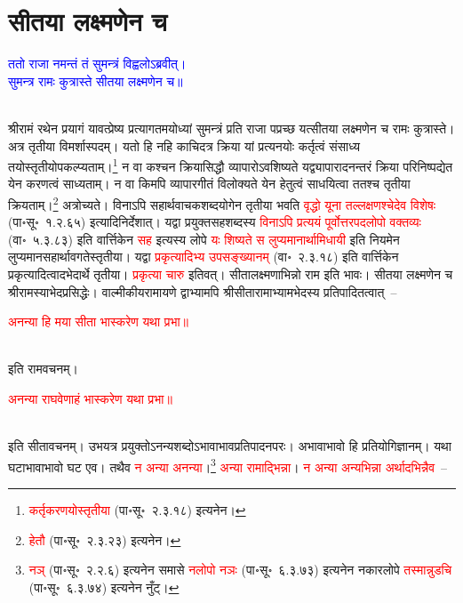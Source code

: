 \section[सीतया लक्ष्मणेन च]{सीतया लक्ष्मणेन च}
\label{sec:sitaya_lakmanena_ca}
\centering\textcolor{blue}{ततो राजा नमन्तं तं सुमन्त्रं विह्वलोऽब्रवीत्।\nopagebreak\\
सुमन्त्र रामः कुत्रास्ते सीतया लक्ष्मणेन च॥}\nopagebreak\\
\\
\begin{sloppypar}\justifying\noindent\hspace{10mm} श्रीरामं रथेन प्रयागं यावत्प्रेष्य प्रत्यागतमयोध्यां सुमन्त्रं प्रति राजा पप्रच्छ यत्सीतया लक्ष्मणेन च रामः कुत्रास्ते। अत्र तृतीया
विमर्शास्पदम्। यतो हि नहि काचिदत्र क्रिया यां प्रत्यनयोः कर्तृत्वं संसाध्य तयोस्तृतीयोपकल्प्यताम्।\footnote{\textcolor{red}{कर्तृ\-करणयोस्तृतीया} (पा॰सू॰~२.३.१८) इत्यनेन।} न वा कश्चन क्रिया\-सिद्धौ व्यापारोऽवशिष्यते यद्व्यापारादनन्तरं क्रिया परिनिष्पद्येत येन करणत्वं साध्यताम्। न वा किमपि 
व्यापार\-गीतं विलोक्यते येन हेतुत्वं साधयित्वा ततश्च तृतीया क्रियताम्।\footnote{\textcolor{red}{हेतौ} (पा॰सू॰~२.३.२३) इत्यनेन।} अत्रोच्यते। विनाऽपि सहार्थ\-वाचक\-शब्द\-योगेन तृतीया भवति \textcolor{red}{वृद्धो यूना तल्लक्षणश्चेदेव विशेषः} (पा॰सू॰~१.२.६५) इत्यादि\-निर्देशात्। यद्वा प्रयुक्त\-सह\-शब्दस्य \textcolor{red}{विनाऽपि प्रत्ययं पूर्वोत्तर\-पद\-लोपो वक्तव्यः} (वा॰~५.३.८३) इति वार्त्तिकेन \textcolor{red}{सह} इत्यस्य लोपे \textcolor{red}{यः शिष्यते स लुप्यमानार्थामिधायी} इति नियमेन लुप्यमान\-सहार्थावगतेस्तृतीया। यद्वा \textcolor{red}{प्रकृत्यादिभ्य उप\-सङ्ख्यानम्‌} (वा॰~२.३.१८) इति वार्त्तिकेन प्रकृत्यादित्वादभेदार्थे तृतीया। \textcolor{red}{प्रकृत्या चारु} इतिवत्। सीतालक्ष्मणाभिन्नो राम इति भावः। सीतया लक्ष्मणेन च श्रीरामस्याभेद\-प्रसिद्धेः। वाल्मीकीय\-रामायणे द्वाभ्यामपि श्रीसीता\-रामाभ्यामभेदस्य प्रतिपादितत्वात्~–\end{sloppypar}
\centering\textcolor{red}{अनन्या हि मया सीता भास्करेण यथा प्रभा॥}\nopagebreak\\
\\
\begin{sloppypar}\justifying\noindent इति रामवचनम्।\end{sloppypar}
\centering\textcolor{red}{अनन्या राघवेणाहं भास्करेण यथा प्रभा॥}\nopagebreak\\
\\
\begin{sloppypar}\justifying\noindent इति सीतावचनम्। उभयत्र प्रयुक्तोऽनन्य\-शब्दोऽभावाभाव\-प्रतिपादन\-परः। अभावाभावो हि प्रतियोगि\-ज्ञानम्। यथा घटाभावाभावो घट एव। तथैव \textcolor{red}{न अन्या अनन्या}।\footnote{\textcolor{red}{नञ्‌} (पा॰सू॰~२.२.६) इत्यनेन समासे \textcolor{red}{नलोपो नञः} (पा॰सू॰~६.३.७३) इत्यनेन नकार\-लोपे \textcolor{red}{तस्मान्नुडचि} (पा॰सू॰~६.३.७४) इत्यनेन नुँट्।} \textcolor{red}{अन्या रामाद्भिन्ना}। \textcolor{red}{न अन्या अन्यभिन्ना अर्थादभिन्नैव}~–\end{sloppypar}
